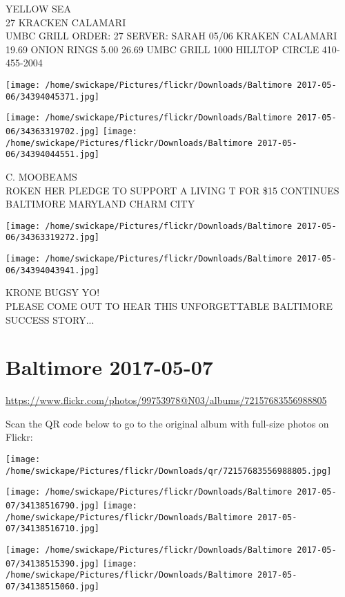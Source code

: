 \documentclass[10pt,letterpaper]{article}
\begin{document}
YELLOW SEA\\
27 KRACKEN CALAMARI\\
UMBC GRILL ORDER: 27 SERVER: SARAH 05/06 KRAKEN CALAMARI 19.69 ONION RINGS 5.00 26.69 UMBC GRILL 1000 HILLTOP CIRCLE 410{-}455{-}2004
\pagebreak

\texttt{[image: /home/swickape/Pictures/flickr/Downloads/Baltimore 2017-05-06/34394045371.jpg]}

\vspace{0.25in}
\texttt{[image: /home/swickape/Pictures/flickr/Downloads/Baltimore 2017-05-06/34363319702.jpg]}
\texttt{[image: /home/swickape/Pictures/flickr/Downloads/Baltimore 2017-05-06/34394044551.jpg]}

C. MOOBEAMS\\
ROKEN HER PLEDGE TO SUPPORT A LIVING T FOR \$15 CONTINUES\\
BALTIMORE MARYLAND CHARM CITY
\pagebreak

\texttt{[image: /home/swickape/Pictures/flickr/Downloads/Baltimore 2017-05-06/34363319272.jpg]}

\vspace{0.25in}
\texttt{[image: /home/swickape/Pictures/flickr/Downloads/Baltimore 2017-05-06/34394043941.jpg]}

KRONE BUGSY YO!\\
PLEASE COME OUT TO HEAR THIS UNFORGETTABLE BALTIMORE SUCCESS STORY...
\pagebreak

\section*{Baltimore 2017-05-07}

\url{https://www.flickr.com/photos/99753978@N03/albums/72157683556988805}

Scan the QR code below to go to the original album with full-size photos on Flickr:

\texttt{[image: /home/swickape/Pictures/flickr/Downloads/qr/72157683556988805.jpg]}
\pagebreak

\texttt{[image: /home/swickape/Pictures/flickr/Downloads/Baltimore 2017-05-07/34138516790.jpg]}
\texttt{[image: /home/swickape/Pictures/flickr/Downloads/Baltimore 2017-05-07/34138516710.jpg]}

\texttt{[image: /home/swickape/Pictures/flickr/Downloads/Baltimore 2017-05-07/34138515390.jpg]}
\texttt{[image: /home/swickape/Pictures/flickr/Downloads/Baltimore 2017-05-07/34138515060.jpg]}
\end{document}
